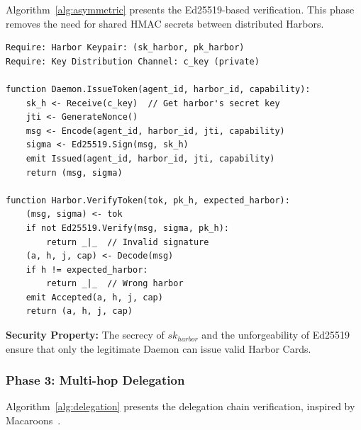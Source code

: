 \documentclass[11pt,a4paper]{article}
\theoremstyle{definition}
\begin{document}
Algorithm~\ref{alg:asymmetric} presents the Ed25519-based verification. This phase removes the need for shared HMAC secrets between distributed Harbors.

\begin{lstlisting}[caption={Algorithm 2: Asymmetric Harbor Verification (Ed25519)},label={alg:asymmetric}]
Require: Harbor Keypair: (sk_harbor, pk_harbor)
Require: Key Distribution Channel: c_key (private)

function Daemon.IssueToken(agent_id, harbor_id, capability):
    sk_h <- Receive(c_key)  // Get harbor's secret key
    jti <- GenerateNonce()
    msg <- Encode(agent_id, harbor_id, jti, capability)
    sigma <- Ed25519.Sign(msg, sk_h)
    emit Issued(agent_id, harbor_id, jti, capability)
    return (msg, sigma)

function Harbor.VerifyToken(tok, pk_h, expected_harbor):
    (msg, sigma) <- tok
    if not Ed25519.Verify(msg, sigma, pk_h):
        return _|_  // Invalid signature
    (a, h, j, cap) <- Decode(msg)
    if h != expected_harbor:
        return _|_  // Wrong harbor
    emit Accepted(a, h, j, cap)
    return (a, h, j, cap)
\end{lstlisting}

\textbf{Security Property:} The secrecy of $sk_{harbor}$ and the unforgeability of Ed25519~\cite{bernstein2012high} ensure that only the legitimate Daemon can issue valid Harbor Cards.

\subsubsection{Phase 3: Multi-hop Delegation}\label{sec:delegation}

Algorithm~\ref{alg:delegation} presents the delegation chain verification, inspired by Macaroons~\cite{birgisson2014macaroons}.
\end{document}
